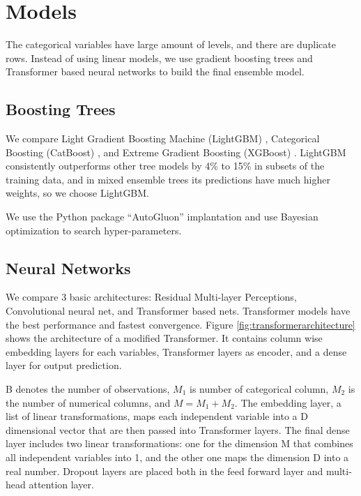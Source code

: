 \documentclass[11pt, letter,twocolumn]{article}
\begin{document}
\section{Models}
The categorical variables have large amount of levels, and there are duplicate rows. Instead of using linear models, we use    gradient boosting trees   and   Transformer based neural networks to build the final ensemble model. 

\subsection{Boosting Trees  }
We compare Light Gradient Boosting Machine (LightGBM) \parencite{ke2017lightgbm},   Categorical Boosting (CatBoost) \parencite{dorogush2018catboost}, and Extreme Gradient Boosting (XGBoost) \parencite{XGBoost2016}. LightGBM consistently outperforms other tree models by 4\% to 15\% in subsets of the training data, and in mixed ensemble trees its predictions have much higher weights, so we choose LightGBM.

We use the Python package ``AutoGluon'' \parencite{erickson_autogluon-tabular:_2020} implantation and use Bayesian optimization to search hyper-parameters.  

\subsection{Neural Networks}
We compare 3 basic architectures: Residual Multi-layer Perceptions,  Convolutional neural net, and Transformer based nets. Transformer models have the best performance and fastest convergence. 
Figure \ref{fig:transformerarchitecture} shows the architecture of a modified Transformer. It contains column wise embedding layers for each variables, Transformer layers as encoder, and a dense layer for output prediction. 

B denotes the number of observations, $ M_1 $ is number of categorical column, $ M_2 $ is the number of numerical columns, and $ M = M_1 + M_2 $. The embedding layer, a list of linear transformations, maps each independent variable into a D dimensional vector that are then passed into  Transformer layers. The final dense layer includes two linear transformations: one for the dimension M that combines all independent variables into 1, and the other one maps the dimension D into a real number. Dropout layers are placed both in the feed forward layer and multi-head attention layer. 
\end{document}
